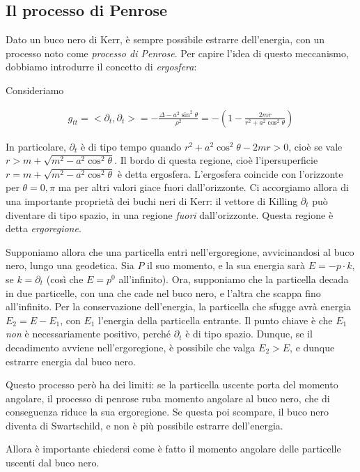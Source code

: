 \documentclass{report}
\begin{document}
\subsection{Il processo di Penrose}


Dato un buco nero di Kerr, è sempre possibile estrarre dell'energia, con un processo noto come \emph{processo di Penrose}. Per capire l'idea di questo meccanismo, dobbiamo introdurre il concetto di \emph{ergosfera}: 

Consideriamo 

\begin{align}
    g_{tt} = <\partial_t, \partial_t> = -\frac{\Delta-a^2\sin^2\theta}{\rho^2} = -\left(1-\frac{2mr}{r^2+a^2\cos^2\theta} \right)
\end{align}

In particolare, \(\partial_t\) è di tipo tempo quando \(r^2+a^2\cos^2\theta - 2mr >0\), cioè se vale \(r > m + \sqrt{m^2-a^2\cos^2\theta}\). Il bordo di questa regione, cioè l'ipersuperficie \(r = m+\sqrt{m^2-a^2\cos^2\theta}\) è detta ergosfera. L'ergosfera coincide con l'orizzonte per \(\theta = 0, \pi\) ma per altri valori giace fuori dall'orizzonte. Ci accorgiamo allora di una importante proprietà dei buchi neri di Kerr: il vettore di Killing \(\partial_t\) può diventare di tipo spazio, in una regione \emph{fuori} dall'orizzonte. Questa regione è detta \emph{ergoregione}. 

Supponiamo allora che una particella entri nell'ergoregione, avvicinandosi al buco nero, lungo una geodetica. Sia \(P\) il suo momento, e la sua energia sarà \(E = -p\cdot k\), se \(k = \partial_t\) (così che \(E = p^0\) all'infinito). Ora, supponiamo che la particella decada in due particelle, con una che cade nel buco nero, e l'altra che scappa fino all'infinito. Per la conservazione dell'energia, la particella che sfugge avrà energia \(E_2 = E -E_1\), con \(E_1\) l'energia della particella entrante. Il punto chiave è che \(E_1\) \emph{non} è necessariamente positivo, perché \(\partial_t\) è di tipo spazio. Dunque, se il decadimento avviene nell'ergoregione, è possibile che valga \(E_2 > E\), e dunque estrarre energia dal buco nero. 

Questo processo però ha dei limiti: se la particella uscente porta del momento angolare, il processo di penrose ruba momento angolare al buco nero, che di conseguenza riduce la sua ergoregione. Se questa poi scompare, il buco nero diventa di Swartschild, e non è più possibile estrarre dell'energia. 

Allora è importante chiedersi come è fatto il momento angolare delle particelle uscenti dal buco nero. 
\end{document}
